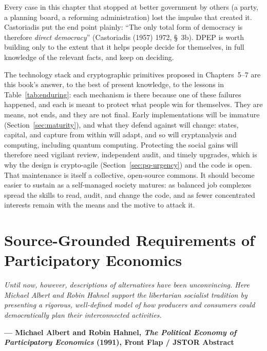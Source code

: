 \documentclass[10pt,twoside,openany]{book}
\theoremstyle{dpepstyle}
\newcommand{\chapterepigraph}[2]{%
  \vspace{-0.4em}
  \begin{FlushRight}
  \begin{minipage}{0.82\textwidth}
    \itshape\small\color{SlateDark} #1\par
    \vspace{3pt}
    \upshape\footnotesize\textbf{--- #2}
  \end{minipage}
  \end{FlushRight}
  \vspace{1em}
}
\newenvironment{FlushRight}{\begin{flushright}}{\end{flushright}}
\begin{document}
Every case in this chapter that stopped at better government by others (a party, a planning board, a reforming administration) lost the impulse that created it. Castoriadis put the end point plainly: ``The only total form of democracy is therefore \emph{direct democracy}'' (Castoriadis (1957) 1972, \S~3b). DPEP is worth building only to the extent that it helps people decide for themselves, in full knowledge of the relevant facts, and keep on deciding.

The technology stack and cryptographic primitives proposed in Chapters~5--7 are this book's answer, to the best of present knowledge, to the lessons in Table~\ref{tab:enduring}: each mechanism is there because one of these failures happened, and each is meant to protect what people win for themselves. They are means, not ends, and they are not final. Early implementations will be immature (Section~\ref{sec:maturity}), and what they defend against will change: states, capital, and capture from within will adapt, and so will cryptanalysis and computing, including quantum computing. Protecting the social gains will therefore need vigilant review, independent audit, and timely upgrades, which is why the design is crypto-agile (Section~\ref{sec:pq-urgency}) and the code is open. That maintenance is itself a collective, open-source commons. It should become easier to sustain as a self-managed society matures: as balanced job complexes spread the skills to read, audit, and change the code, and as fewer concentrated interests remain with the means and the motive to attack it.

\chapter{Source-Grounded Requirements of Participatory Economics}
\label{ch:requirements}

\chapterepigraph{Until now, however, descriptions of alternatives have been unconvincing. Here Michael Albert and Robin Hahnel support the libertarian socialist tradition by presenting a rigorous, well-defined model of how producers and consumers could democratically plan their interconnected activities.}{Michael Albert and Robin Hahnel, \emph{The Political Economy of Participatory Economics} (1991), Front Flap / JSTOR Abstract\protect\footnotemark}
\end{document}
